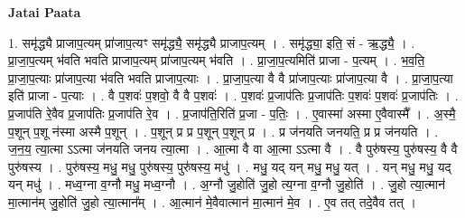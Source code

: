 \documentclass[17pt]{extarticle}
\begin{document}
\textbf{Jatai Paata} \newline

1. समृ॑द्ध्यै प्राजाप॒त्यम् प्रा॑जाप॒त्यꣳ समृ॑द्ध्यै॒ समृ॑द्ध्यै प्राजाप॒त्यम् । . समृ॑द्ध्या॒ इति॒ सं - ऋ॒द्ध्यै॒ । . प्रा॒जा॒प॒त्यम् भ॑वति भवति प्राजाप॒त्यम् प्रा॑जाप॒त्यम् भ॑वति । . प्रा॒जा॒प॒त्यमिति॑ प्राजा - प॒त्यम् । . भ॒व॒ति॒ प्रा॒जा॒प॒त्याः प्रा॑जाप॒त्या भ॑वति भवति प्राजाप॒त्याः । . प्रा॒जा॒प॒त्या वै वै प्रा॑जाप॒त्याः प्रा॑जाप॒त्या वै । . प्रा॒जा॒प॒त्या इति॑ प्राजा - प॒त्याः । . वै प॒शवः॑ प॒शवो॒ वै वै प॒शवः॑ । . प॒शवः॑ प्र॒जाप॑तिः प्र॒जाप॑तिः प॒शवः॑ प॒शवः॑ प्र॒जाप॑तिः । . प्र॒जाप॑ति रे॒वैव प्र॒जाप॑तिः प्र॒जाप॑ति रे॒व । . प्र॒जाप॑ति॒रिति॑ प्र॒जा - प॒तिः॒ । . ए॒वास्मा॑ अस्मा ए॒वैवास्मै᳚ । . अ॒स्मै॒ प॒शून् प॒शू न॑स्मा अस्मै प॒शून् । . प॒शून् प्र प्र प॒शून् प॒शून् प्र । . प्र ज॑नयति जनयति॒ प्र प्र ज॑नयति । . ज॒न॒य॒ त्या॒त्मा ऽऽत्मा ज॑नयति जनय त्या॒त्मा । . आ॒त्मा वै वा आ॒त्मा ऽऽत्मा वै । . वै पुरु॑षस्य॒ पुरु॑षस्य॒ वै वै पुरु॑षस्य । . पुरु॑षस्य॒ मधु॒ मधु॒ पुरु॑षस्य॒ पुरु॑षस्य॒ मधु॑ । . मधु॒ यद् यन् मधु॒ मधु॒ यत् । . यन् मधु॒ मधु॒ यद् यन् मधु॑ । . मध्व॒ग्ना व॒ग्नौ मधु॒ मध्व॒ग्नौ । . अ॒ग्नौ जु॒होति॑ जु॒हो त्य॒ग्ना व॒ग्नौ जु॒होति॑ । . जु॒हो त्या॒त्मान॑ मा॒त्मान॑म् जु॒होति॑ जु॒हो त्या॒त्मान᳚म् । . आ॒त्मान॑ मे॒वैवात्मान॑ मा॒त्मान॑ मे॒व । . ए॒व तत् तदे॒वैव तत् । \newline
\end{document}
